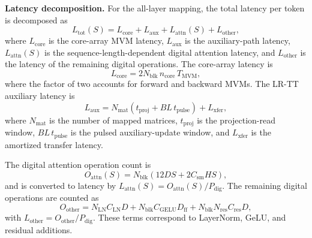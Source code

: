 \documentclass[AMA,LATO1COL]{WileyNJDv5}
\begin{document}
\noindent\textbf{Latency decomposition.}
For the all-layer mapping, the total latency per token is decomposed as
\begin{equation}
L_{\mathrm{tot}}(S)
=
L_{\mathrm{core}}
+
L_{\mathrm{aux}}
+
L_{\mathrm{attn}}(S)
+
L_{\mathrm{other}},
\label{eq:supp_total_latency}
\end{equation}
where \(L_{\mathrm{core}}\) is the core-array MVM latency, \(L_{\mathrm{aux}}\) is the auxiliary-path latency, \(L_{\mathrm{attn}}(S)\) is the sequence-length-dependent digital attention latency, and \(L_{\mathrm{other}}\) is the latency of the remaining digital operations. The core-array latency is
\begin{equation}
L_{\mathrm{core}}
=
2N_{\mathrm{blk}}\,n_{\mathrm{core}}\,T_{\mathrm{MVM}},
\label{eq:supp_core_latency}
\end{equation}
where the factor of two accounts for forward and backward MVMs. The LR-TT auxiliary latency is
\begin{equation}
L_{\mathrm{aux}}
=
N_{\mathrm{mat}}
\left(t_{\mathrm{proj}}+BL\,t_{\mathrm{pulse}}\right)
+
L_{\mathrm{xfer}},
\label{eq:supp_aux_latency}
\end{equation}
where \(N_{\mathrm{mat}}\) is the number of mapped matrices, \(t_{\mathrm{proj}}\) is the projection-read window, \(BL\,t_{\mathrm{pulse}}\) is the pulsed auxiliary-update window, and \(L_{\mathrm{xfer}}\) is the amortized transfer latency.

\noindent
The digital attention operation count is
\begin{equation}
O_{\mathrm{attn}}(S)
=
N_{\mathrm{blk}}
\left(
12DS
+
2C_{\mathrm{sm}}HS
\right),
\label{eq:supp_attn_ops}
\end{equation}
and is converted to latency by \(L_{\mathrm{attn}}(S)=O_{\mathrm{attn}}(S)/P_{\mathrm{dig}}\). The remaining digital operations are counted as
\begin{equation}
O_{\mathrm{other}}
=
N_{\mathrm{LN}}C_{\mathrm{LN}}D
+
N_{\mathrm{blk}}C_{\mathrm{GELU}}D_{\mathrm{ff}}
+
N_{\mathrm{blk}}N_{\mathrm{res}}C_{\mathrm{res}}D,
\label{eq:supp_other_ops}
\end{equation}
with \(L_{\mathrm{other}}=O_{\mathrm{other}}/P_{\mathrm{dig}}\). These terms correspond to LayerNorm, GeLU, and residual additions.
\end{document}
